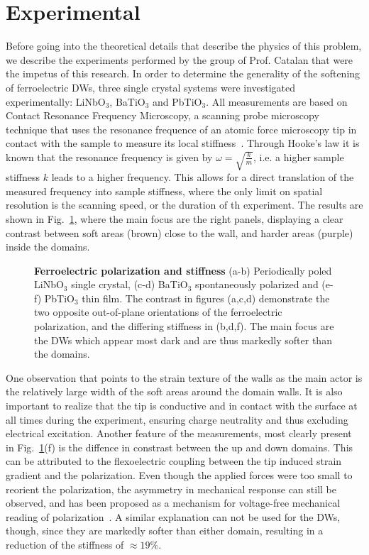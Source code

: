 \section{Experimental}
Before going into the theoretical details that describe the physics of this problem, we describe the experiments performed by the group of Prof. Catalan that were the impetus of this research.
In order to determine the generality of the softening of ferroelectric DWs, three single crystal systems were investigated experimentally: LiNbO$_3$, BaTiO$_3$ and PbTiO$_3$.
All measurements are based on Contact Resonance Frequency Microscopy, a scanning probe microscopy technique that uses the resonance frequence of an atomic force microscopy tip in contact with the sample to measure its local stiffness~\cite{Rabe2000}.
Through Hooke's law it is known that the resonance frequency is given by $\omega = \sqrt{\frac{k}{m}}$, i.e. a higher sample stiffness $k$ leads to a higher frequency.
This allows for a direct translation of the measured frequency into sample stiffness, where the only limit on spatial resolution is the scanning speed, or the duration of th experiment.
The results are shown in Fig.~\ref{fig:BTO_experiment}, where the main focus are the right panels, displaying a clear contrast between soft areas (brown) close to the wall, and harder areas (purple) inside the domains.
\begin{figure}
	\caption{\label{fig:BTO_experiment} {\bf Ferroelectric polarization and stiffness} (a-b) Periodically poled LiNbO$_3$ single crystal, (c-d) BaTiO$_3$ spontaneously polarized and (e-f) PbTiO$_3$ thin film. The contrast in figures (a,c,d) demonstrate the two opposite out-of-plane orientations of the ferroelectric polarization, and the differing stiffness in (b,d,f). The main focus are the DWs which appear most dark and are thus markedly softer than the domains.}
\end{figure}
One observation that points to the strain texture of the walls as the main actor is the relatively large width of the soft areas around the domain walls.
It is also important to realize that the tip is conductive and in contact with the surface at all times during the experiment, ensuring charge neutrality and thus excluding electrical excitation.
Another feature of the measurements, most clearly present in Fig.~\ref{fig:BTO_experiment}(f) is the diffence in constrast between the up and down domains.
This can be attributed to the flexoelectric coupling between the tip induced strain gradient and the polarization.
Even though the applied forces were too small to reorient the polarization, the asymmetry in mechanical response can still be observed, and has been proposed as a mechanism for voltage-free mechanical reading of polarization~\cite{Cordero-Edwards2017,Cordero-Edwards2019,Abdollahi2015}.
A similar explanation can not be used for the DWs, though, since they are markedly softer than either domain, resulting in a reduction of the stiffness of $\approx 19\%$.

